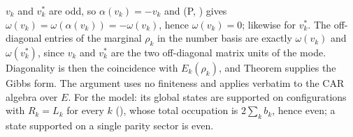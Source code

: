 $v_k$ and $v_k^{*}$ are odd, so $\alpha(v_k) = -v_k$ and (P, ) gives $\omega(v_k) = \omega(\alpha(v_k)) = -\omega(v_k)$, hence $\omega(v_k) = 0$; likewise for $v_k^{*}$. The off-diagonal entries of the marginal $\rho_k$ in the number basis are exactly $\omega(v_k)$ and $\omega(v_k^{*})$, since $v_k$ and $v_k^{*}$ are the two off-diagonal matrix units of the mode. Diagonality is then the coincidence with $E_k(\rho_k)$, and Theorem  supplies the Gibbs form. The argument uses no finiteness and applies verbatim to the CAR algebra over $E$. For the model: its global states are supported on configurations with $R_k = L_k$ for every $k$ \cite[Lem.~12.1]{ButlerT5} (), whose total occupation is $2\sum_k b_k$, hence even; a state supported on a single parity sector is even.
